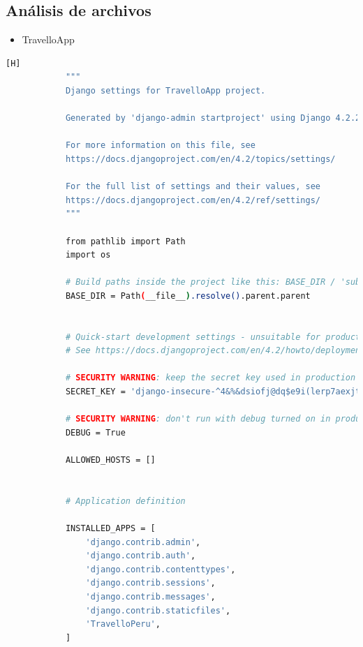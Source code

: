 \documentclass{article}
\begin{document}
	\subsection{Análisis de archivos }
            
            \begin{itemize}
                \item TravelloApp
            \end{itemize}
    
            \begin{lstlisting}[language=bash,caption={urls.py}][H]
            """
            Django settings for TravelloApp project.
            
            Generated by 'django-admin startproject' using Django 4.2.2.
            
            For more information on this file, see
            https://docs.djangoproject.com/en/4.2/topics/settings/
            
            For the full list of settings and their values, see
            https://docs.djangoproject.com/en/4.2/ref/settings/
            """
            
            from pathlib import Path
            import os
            
            # Build paths inside the project like this: BASE_DIR / 'subdir'.
            BASE_DIR = Path(__file__).resolve().parent.parent
            
            
            # Quick-start development settings - unsuitable for production
            # See https://docs.djangoproject.com/en/4.2/howto/deployment/checklist/
            
            # SECURITY WARNING: keep the secret key used in production secret!
            SECRET_KEY = 'django-insecure-^4&%&dsiofj@dq$e9i(lerp7aexjtm#5$v$r-&%_!l$cjc#9je'
            
            # SECURITY WARNING: don't run with debug turned on in production!
            DEBUG = True
            
            ALLOWED_HOSTS = []
            
            
            # Application definition
            
            INSTALLED_APPS = [
                'django.contrib.admin',
                'django.contrib.auth',
                'django.contrib.contenttypes',
                'django.contrib.sessions',
                'django.contrib.messages',
                'django.contrib.staticfiles',
                'TravelloPeru',
            ]
            

\end{lstlisting}
\end{document}
